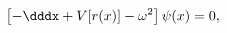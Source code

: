 \begin{equation} \label{wave-equation}
\left[ - \dddx + V[r(x)] - \omega^2 \right] \psi(x) = 0,
\end{equation}

